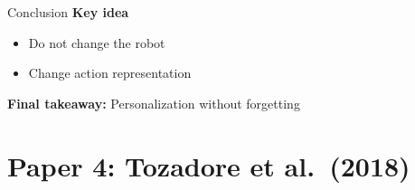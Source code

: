 \documentclass[aspectratio=169,10pt]{beamer}
\newcommand{\refnum}[1]{{\footnotesize\color{giuaccent}[#1]}}
\begin{document}
\begin{frame}{Conclusion}
\footnotesize
\textbf{Key idea}

\begin{itemize}\footnotesize
    \item Do not change the robot
    \item Change action representation
\end{itemize}

\vspace{0.5em}
\textbf{Final takeaway:} Personalization without forgetting
\end{frame}

\section{Paper 4: Tozadore et al.\ (2018)}

\end{document}
